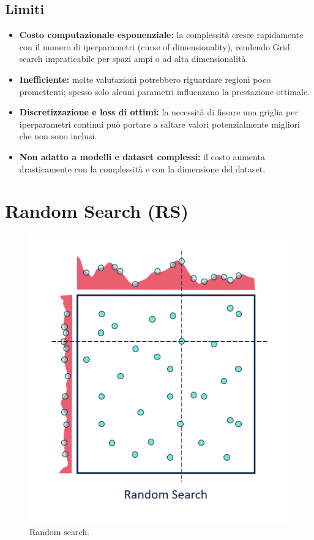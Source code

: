 \documentclass[a4paper,12pt]{report}
\begin{document}
	\subsection{Limiti}
	\begin{itemize}
		\item \textbf{Costo computazionale esponenziale:} la complessità cresce rapidamente con il numero di iperparametri (curse of dimensionality), rendendo Grid search impraticabile per spazi ampi o ad alta dimensionalità.
		\item \textbf{Inefficiente:} molte valutazioni potrebbero riguardare regioni poco promettenti; spesso solo alcuni parametri influenzano la prestazione ottimale.
		\item \textbf{Discretizzazione e loss di ottimi:} la necessità di fissare una griglia per iperparametri continui può portare a saltare valori potenzialmente migliori che non sono inclusi.
		\item \textbf{Non adatto a modelli e dataset complessi:} il costo aumenta drasticamente con la complessità e con la dimensione del dataset.
	\end{itemize}
	
	\section{Random Search (RS)}
	\begin{figure}[H]
		\centering
		\includegraphics[width=1.0\textwidth]{img/rs.png}
		\caption{Random search.}
	\end{figure}
\end{document}
